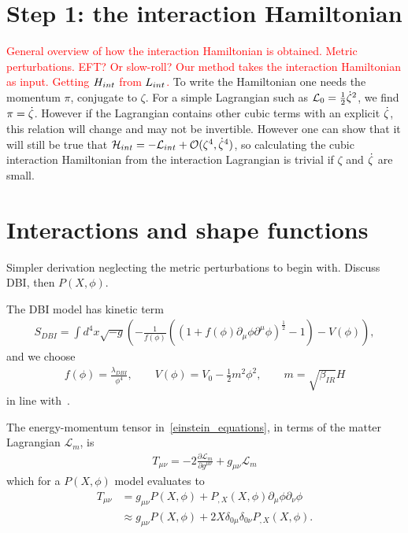     \section{Step 1: the interaction Hamiltonian}
    \textcolor{red}{
    General overview of how the interaction Hamiltonian is obtained.
    Metric perturbations.
    EFT? Or slow-roll? Our method takes the interaction Hamiltonian
    as input. Getting $H_{int}$ from $L_{int}$.}
    To write the Hamiltonian one needs the momentum $\pi$, conjugate to $\zeta$.
    For a simple Lagrangian such as $\mathcal{L}_0=\frac{1}{2}\dot{\zeta}^2$,
    we find $\pi=\dot{\zeta}$. However if the Lagrangian contains other cubic terms
    with an explicit $\dot{\zeta}$, this relation will change and may not be invertible.
    However one can show that it will still be true that $\mathcal{H}_{int}=-\mathcal{L}_{int}+\mathcal{O}(\zeta^4,\dot{\zeta}^4)$,
    so calculating the cubic interaction Hamiltonian from the interaction Lagrangian is trivial
    if $\zeta$ and $\dot{\zeta}$ are small.


    \section{Interactions and shape functions}\label{sec:interactions}
    Simpler derivation neglecting the metric perturbations to begin with.
    Discuss DBI, then $P(X, \phi)$.


    The DBI model has kinetic term
\begin{align}\label{eq:dbi_action}
    S_{DBI}=\int d^4x\sqrt{-g}\left(-\frac{1}{f(\phi)}\left(\left(1+f(\phi)\partial_\mu\phi\partial^\mu\phi\right)^{\frac{1}{2}}-1\right)-V(\phi)\right),
\end{align}
and we choose
\begin{align}\label{eq:dbi_warp}
    f(\phi)=\frac{\lambda_{DBI}}{\phi^4},\qquad
    V(\phi)=V_0-\frac{1}{2}m^2\phi^2,\qquad
    m=\sqrt{\beta_{IR}}H
\end{align}
in line with~\cite{Bean_ir_dbi, Chen_dbi}.


The energy-momentum tensor in~\eqref{einstein_equations}, in terms of the matter Lagrangian $\mathcal{L}_m$, is
\begin{align}
    T_{\mu\nu} = -2\frac{\partial \mathcal{L}_m}{\partial g^{\mu\nu}}
                + g_{\mu\nu}\mathcal{L}_m
\end{align}
which for a $P(X,\phi)$ model evaluates to
\begin{align}
    T_{\mu\nu} &= g_{\mu\nu}P(X,\phi)+P_{,X}(X,\phi)\partial_{\mu}\phi\partial_{\nu}\phi\\
            &\approx g_{\mu\nu}P(X,\phi)+2X\delta_{0\mu}\delta_{0\nu}P_{,X}(X,\phi).
\end{align}


